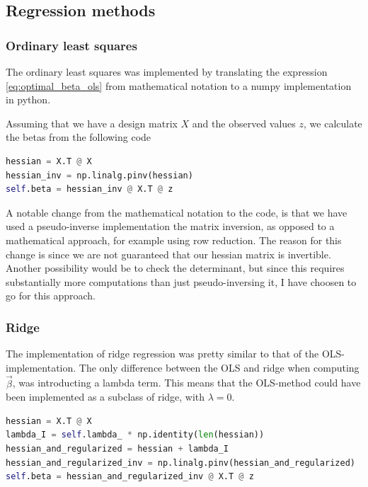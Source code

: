 \documentclass[12pt]{article}
\newcommand{\bbeta}{\vec{\beta}}
\begin{document}
\subsection{Regression methods}

\subsubsection{Ordinary least squares}

The ordinary least squares was implemented by translating the expression \eqref{eq:optimal_beta_ols} from mathematical notation to a numpy implementation in python.

Assuming that we have a design matrix $X$ and the observed values $z$, we calculate the betas from the following code

\begin{lstlisting}[language=python]
hessian = X.T @ X
hessian_inv = np.linalg.pinv(hessian)
self.beta = hessian_inv @ X.T @ z
\end{lstlisting}

A notable change from the mathematical notation to the code, is that we have used a pseudo-inverse implementation the matrix inversion, as opposed to a mathematical approach, for example using row reduction.
The reason for this change is since we are not guaranteed that our hessian matrix is invertible.
Another possibility would be to check the determinant, but since this requires substantially more computations than just pseudo-inversing it, I have choosen to go for this approach.

\subsubsection{Ridge}

The implementation of ridge regression was pretty similar to that of the OLS-implementation.
The only difference between the OLS and ridge when computing $\bbeta$, was introducting a lambda term.
This means that the OLS-method could have been implemented as a subclass of ridge, with $\lambda=0$.

\begin{lstlisting}[language=python]
hessian = X.T @ X
lambda_I = self.lambda_ * np.identity(len(hessian))
hessian_and_regularized = hessian + lambda_I
hessian_and_regularized_inv = np.linalg.pinv(hessian_and_regularized)
self.beta = hessian_and_regularized_inv @ X.T @ z
\end{lstlisting}
\end{document}
